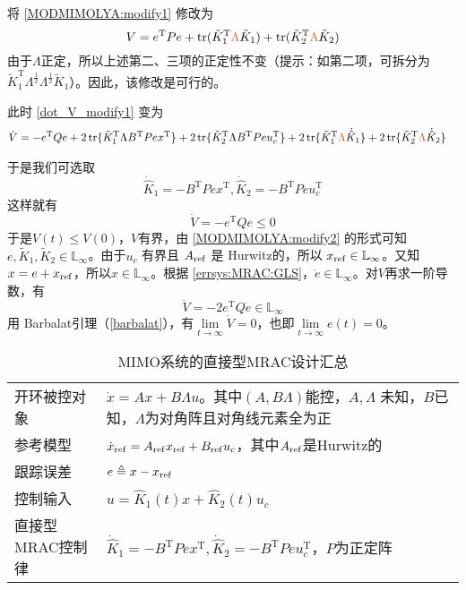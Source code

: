 将 \eqref{MODMIMOLYA:modify1} 修改为
\begin{equation}\label{MODMIMOLYA:modify2}
  V=e^\mathrm{T}Pe+\tr(\tilde{K}_1^\mathrm{T}\textcolor{second}{\Lambda}\tilde{K}_1)+\tr(\tilde{K}_2^\mathrm{T}\textcolor{second}{\Lambda}\tilde{K}_2)
\end{equation}
由于$\Lambda$正定，所以上述第二、三项的正定性不变（提示：如第二项，可拆分为$\tilde{K}_1^\mathrm{T}\Lambda^\frac{1}{2}\Lambda^\frac{1}{2}\tilde{K}_1$）。因此，该修改是可行的。

此时 \eqref{dot_V_modify1} 变为
\begin{align*}
  \dot{V} &= -e^\mathrm{T}Q e +
  2\tr \{ \tilde{K}^\mathrm{T}_1 \Lambda B^\mathrm{T}  P  e  x^\mathrm{T} \} +
  2\tr \{ \tilde{K}^\mathrm{T}_2 \Lambda B^\mathrm{T}  P  e  u_c^\mathrm{T} \} +
  2\tr \{ \tilde{K}^\mathrm{T}_1 \textcolor{second}{\Lambda} \dot{\hat{K}} _1 \}
  + 2\tr \{ \tilde{K}^\mathrm{T}_2 \textcolor{second}{\Lambda} \dot{\hat{K}} _2 \}
\end{align*}

于是我们可选取
\[\dot{\hat{K}} _1 = - B^\mathrm{T}  P  e  x^\mathrm{T}, \dot{\hat{K}} _2 = - B^\mathrm{T}  P  e  u^\mathrm{T}_c\]
这样就有
\[ \dot{V} = - e^\mathrm{T} Q  e \leq 0 \]
于是$V (t) \leq V (0)$，$V$有界，由 \eqref{MODMIMOLYA:modify2} 的形式可知 $e, \tilde{K}_1, \tilde{K}_2 \in
\mathbb{L}_{\infty}$。由于$u_c$ 有界且
$A_{\operatorname{ref}}$ 是 Hurwitz的，所以
$x_{\operatorname{ref}} \in \mathbb{L}_{\infty}$。又知 $x = e +x_{\operatorname{ref}}$，所以$x \in \mathbb{L}_{\infty}$。根据 \eqref{errsys:MRAC:GLS}，$\dot{e} \in \mathbb{L}_{\infty}$。对$V$再求一阶导数，有
\[ \ddot{V} = - 2 e^\mathrm{T} Q  \dot{e} \in \mathbb{L}_{\infty} \]
用 Barbalat引理（\ref{barbalat}），有$\lim\limits_{t \rightarrow \infty} \dot{V} = 0$，也即$\lim\limits_{t \rightarrow \infty} e (t) = 0$。

\begin{table}[htbp]
  \centering
  \setcellgapes{4pt}
  \makegapedcells
  \caption{MIMO系统的直接型MRAC设计汇总}
  \begin{tabular}{p{4.0cm}p{10.0cm}}
    \hline
    开环被控对象 & $\dot{x} = A  x + B \Lambda u$。其中$(A,B\Lambda)$能控，$ A, \Lambda $ 未知，$B$已知，$\Lambda$为对角阵且对角线元素全为正\\
    参考模型 & $\dot{x}_{\operatorname{ref}} =
    A_{\operatorname{ref}} x_{\operatorname{ref}} +
    B_{\operatorname{ref}} u_c$，其中$ A_{\operatorname{ref}}$是Hurwitz的\\
    跟踪误差 & $e \triangleq x - x_{\operatorname{ref}}$\\
    控制输入 & $u = \hat{K}_1 (t) x + \hat{K}_2 (t) u_c$\\
    直接型MRAC控制律& $\dot{\hat{K}} _1 = - B^\mathrm{T}  P  e  x^\mathrm{T}, \dot{\hat{K}} _2 = - B^\mathrm{T}  P  e  u^\mathrm{T}_c$，$P$为正定阵\\
    \hline
  \end{tabular}
\end{table}

